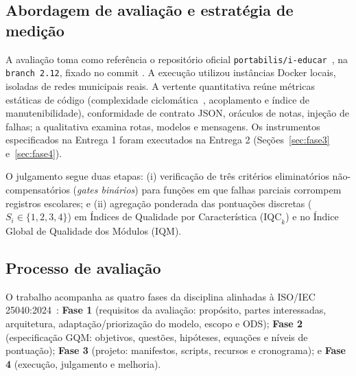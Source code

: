 \documentclass[conference]{model/IEEEtran}%
\begin{document}
\subsection{Abordagem de avaliação e estratégia de medição}
A avaliação toma como referência o repositório oficial \texttt{portabilis/i-educar}~\cite{ieducar_repo}, na \texttt{branch 2.12}, fixado no commit . A execução utilizou instâncias Docker locais, isoladas de redes municipais reais. A vertente quantitativa reúne métricas estáticas de código (complexidade ciclomática~\cite{mccabe1996structured}, acoplamento e índice de manutenibilidade), conformidade de contrato JSON, oráculos de notas, injeção de falhas; a qualitativa examina rotas, modelos e mensagens. Os instrumentos especificados na Entrega 1 foram executados na Entrega 2 (Seções~\ref{sec:fase3} e~\ref{sec:fase4}).

O julgamento segue duas etapas: (i) verificação de três critérios eliminatórios não-compensatórios (\textit{gates binários}) para funções em que falhas parciais corrompem registros escolares; e (ii) agregação ponderada das pontuações discretas ($S_i \in \{1, 2, 3, 4\}$) em Índices de Qualidade por Característica ($\text{IQC}_k$) e no Índice Global de Qualidade dos Módulos ($\text{IQM}$).

\subsection{Processo de avaliação}
O trabalho acompanha as quatro fases da disciplina alinhadas à ISO/IEC 25040:2024~\cite{iso25040}: \textbf{Fase 1} (requisitos da avaliação: propósito, partes interessadas, arquitetura, adaptação/priorização do modelo, escopo e ODS); \textbf{Fase 2} (especificação GQM: objetivos, questões, hipóteses, equações e níveis de pontuação); \textbf{Fase 3} (projeto: manifestos, scripts, recursos e cronograma); e \textbf{Fase 4} (execução, julgamento e melhoria).
\end{document}
